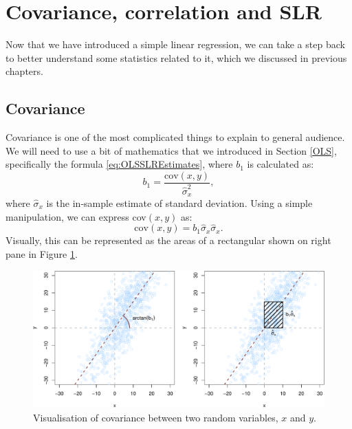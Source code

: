 \documentclass[
]{book}
\theoremstyle{definition}
\theoremstyle{definition}
\theoremstyle{definition}
\theoremstyle{definition}
\theoremstyle{remark}
\begin{document}
\section{Covariance, correlation and SLR}\label{SLRCovariance}

Now that we have introduced a simple linear regression, we can take a step back to better understand some statistics related to it, which we discussed in previous chapters.

\subsection{Covariance}\label{covariance}

Covariance is one of the most complicated things to explain to general audience. We will need to use a bit of mathematics that we introduced in Section \ref{OLS}, specifically the formula \eqref{eq:OLSSLREstimates}, where \(b_1\) is calculated as:
\begin{equation*}
    {b}_1 = \frac{\mathrm{cov}(x,y)}{\hat{\sigma}_x^2} ,
\end{equation*}
where \(\hat{\sigma}_x\) is the in-sample estimate of standard deviation. Using a simple manipulation, we can express cov\((x,y)\) as:
\begin{equation*}
    \mathrm{cov}(x,y) = {b}_1 \hat{\sigma}_x \hat{\sigma}_x .
\end{equation*}
Visually, this can be represented as the areas of a rectangular shown on right pane in Figure \ref{fig:covarianceVisual}.

\begin{figure}
\centering
\includegraphics{Svetunkov---Statistics-for-Business-Analytics_files/figure-latex/covarianceVisual-1.pdf}
\caption{\label{fig:covarianceVisual}Visualisation of covariance between two random variables, \(x\) and \(y\).}
\end{figure}
\end{document}
